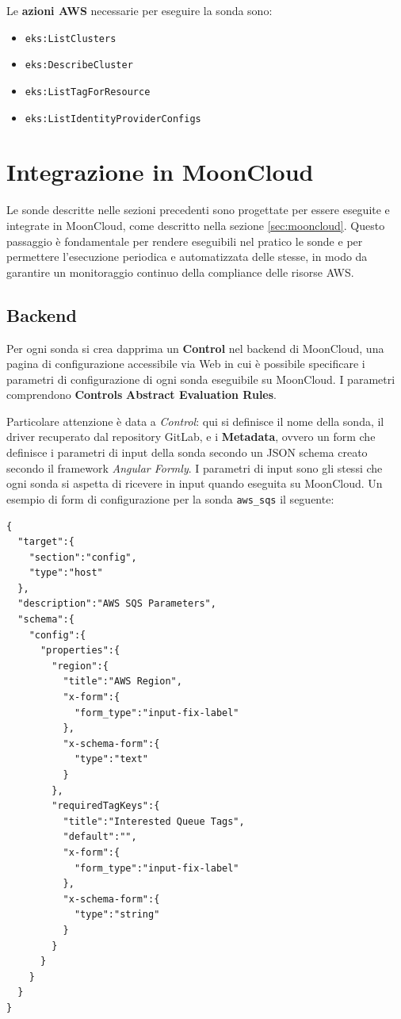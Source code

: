 Le \textbf{azioni AWS} necessarie per eseguire la sonda sono:
\begin{itemize}
    \item \texttt{eks:ListClusters}
    \item \texttt{eks:DescribeCluster}
    \item \texttt{eks:ListTagForResource}
    \item \texttt{eks:ListIdentityProviderConfigs}
\end{itemize}

\section{Integrazione in MoonCloud}
\label{sec:integrazione}

Le sonde descritte nelle sezioni precedenti sono progettate per essere eseguite e integrate in MoonCloud, come descritto nella sezione \ref{sec:mooncloud}. Questo passaggio è fondamentale per rendere eseguibili nel pratico le sonde e per permettere l'esecuzione periodica e automatizzata delle stesse, in modo da garantire un monitoraggio continuo della compliance delle risorse AWS. 

\subsection{Backend}
\label{sec:backend}

Per ogni sonda si crea dapprima un \textbf{Control} nel backend di MoonCloud, una pagina di configurazione accessibile via Web in cui è possibile specificare i parametri di configurazione di ogni sonda eseguibile su MoonCloud. I parametri comprendono \textbf{Controls} \textbf{Abstract Evaluation Rules}. 

Particolare attenzione è data a \textit{Control}: qui si definisce il nome della sonda, il driver recuperato dal repository GitLab, e i \textbf{Metadata}, ovvero un form che definisce i parametri di input della sonda secondo un JSON schema creato secondo il framework \textit{Angular Formly}. I parametri di input sono gli stessi che ogni sonda si aspetta di ricevere in input quando eseguita su MoonCloud. Un esempio di form di configurazione per la sonda \texttt{aws\_sqs} il seguente:

\begin{lstlisting}[style=myjson, caption={Form di configurazione per la sonda \texttt{aws\_sqs}}]
{
  "target":{
    "section":"config",
    "type":"host"
  },
  "description":"AWS SQS Parameters",
  "schema":{
    "config":{
      "properties":{
        "region":{
          "title":"AWS Region",
          "x-form":{
            "form_type":"input-fix-label"
          },
          "x-schema-form":{
            "type":"text"
          }
        },
        "requiredTagKeys":{
          "title":"Interested Queue Tags",
          "default":"",
          "x-form":{
            "form_type":"input-fix-label"
          },
          "x-schema-form":{
            "type":"string"
          }
        }
      }
    }
  }
}
\end{lstlisting}

